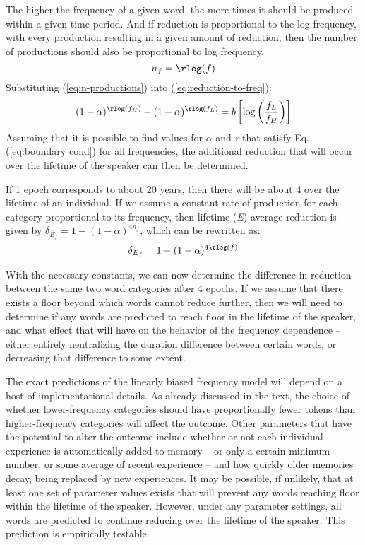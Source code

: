 The higher the frequency of a given word, the more times it should
be produced within a given time period. And if reduction is proportional
to the log frequency, with every production resulting in a given amount
of reduction, then the number of productions should also be proportional
to log frequency. 
\begin{equation}
n_{f}=\rlog(f)\label{eq:n-productions}
\end{equation}
Substituting (\ref{eq:n-productions}) into (\ref{eq:reduction-to-freq}):
\begin{equation}
(1-\alpha)^{\rlog(f_{H})}-(1-\alpha)^{\rlog(f_{L})}=b\left[\log\left(\frac{f_{L}}{f_{H}}\right)\right]\label{eq:boundary cond}
\end{equation}
Assuming that it is possible to find values for $\alpha$ and \emph{r}
that satisfy Eq. (\ref{eq:boundary cond}) for all frequencies, the
additional reduction that will occur over the lifetime of the speaker
can then be determined. 

If 1 epoch corresponds to about 20 years, then there will be about
4 over the lifetime of an individual. If we assume a constant rate
of production for each category proportional to its frequency, then
lifetime (\emph{E}) average reduction is given by $\delta_{E_{f}}=1-(1-\alpha)^{4n_{f}}$,
which can be rewritten as:
\begin{equation}
\delta_{E_{f}}=1-(1-\alpha)^{4\rlog(f)}
\end{equation}

With the necessary constants, we can now determine the difference
in reduction between the same two word categories after 4 epochs.
If we assume that there exists a floor beyond which words cannot reduce
further, then we will need to determine if any words are predicted
to reach floor in the lifetime of the speaker, and what effect that
will have on the behavior of the frequency dependence – either entirely
neutralizing the duration difference between certain words, or decreasing
that difference to some extent. 

The exact predictions of the linearly biased frequency model will
depend on a host of implementational details. As already discussed
in the text, the choice of whether lower-frequency categories should
have proportionally fewer tokens than higher-frequency categories
will affect the outcome. Other parameters that have the potential
to alter the outcome include whether or not each individual experience
is automatically added to memory – or only a certain minimum number,
or some average of recent experience – and how quickly older memories
decay, being replaced by new experiences. It may be possible, if unlikely,
that at least one set of parameter values exists that will prevent
any words reaching floor within the lifetime of the speaker. However,
under any parameter settings, all words are predicted to continue
reducing over the lifetime of the speaker. This prediction is empirically
testable.


